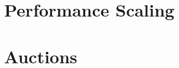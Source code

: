 \documentclass{article}
\begin{document}




    \section{Performance Scaling}
    \label{sec:performance}
    



\newpage

\printbibliography

\newpage

\appendix

    \section{Auctions}
    \label{sec:auctions}
    
\end{document}

